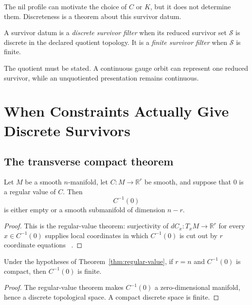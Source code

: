 \documentclass[11pt]{article}
\newcommand{\Surv}{\mathcal S}
\begin{document}
The nil profile can motivate the choice of $C$ or $K$, but it does not
determine them.  Discreteness is a theorem about this survivor datum.

\begin{definition}
A survivor datum is a \emph{discrete survivor filter} when its reduced
survivor set $\Surv$ is discrete in the declared quotient topology.  It is a
\emph{finite survivor filter} when $\Surv$ is finite.
\end{definition}

The quotient must be stated.  A continuous gauge orbit can represent one
reduced survivor, while an unquotiented presentation remains continuous.

\section{When Constraints Actually Give Discrete Survivors}

\subsection{The transverse compact theorem}

\begin{theorem}\label{thm:regular-value}
Let $M$ be a smooth $n$-manifold, let
$C:M\to\mathbb R^r$ be smooth, and suppose that $0$ is a regular value of
$C$.  Then
\[
 C^{-1}(0)
\]
is either empty or a smooth submanifold of dimension $n-r$.
\end{theorem}

\begin{proof}
This is the regular-value theorem: surjectivity of
$dC_x:T_xM\to\mathbb R^r$ for every $x\in C^{-1}(0)$ supplies local
coordinates in which $C^{-1}(0)$ is cut out by $r$ coordinate equations
~\cite{Lee}.
\end{proof}

\begin{corollary}
\label{cor:finite}
Under the hypotheses of Theorem~\ref{thm:regular-value}, if $r=n$ and
$C^{-1}(0)$ is compact, then $C^{-1}(0)$ is finite.
\end{corollary}

\begin{proof}
The regular-value theorem makes $C^{-1}(0)$ a zero-dimensional manifold, hence
a discrete topological space.  A compact discrete space is finite.
\end{proof}
\end{document}
